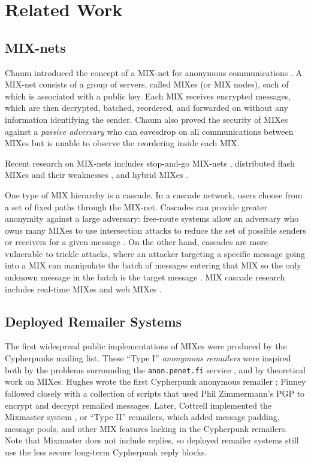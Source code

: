 \documentclass{llncs}
\begin{document}

\section{Related Work}

\subsection{MIX-nets}

Chaum introduced the concept of a MIX-net for anonymous communications
\cite{chaum-mix}. A MIX-net consists of a group of servers, called
MIXes (or MIX nodes), each of which is associated with a public
key. Each MIX receives encrypted messages, which are then decrypted,
batched, reordered, and forwarded on without any information
identifying the sender. Chaum also proved the security of MIXes
against a \emph{passive adversary} who can eavesdrop on all
communications between MIXes but is unable to observe the reordering
inside each MIX.

Recent research on MIX-nets includes stop-and-go MIX-nets
\cite{kesdogan}, distributed flash MIXes \cite{flash-mix} and their
weaknesses \cite{desmedt,mitkuro}, and hybrid MIXes \cite{hybrid-mix}.

One type of MIX hierarchy is a cascade.
In a cascade network, users choose from a set of fixed paths through
the MIX-net.
Cascades can provide greater anonymity against a large adversary:
free-route systems allow an adversary who owns many MIXes to use
intersection attacks to reduce the set of possible senders or receivers
for a given
message \cite{disad-free-routes}. On the other hand, cascades are more
vulnerable \cite{batching-taxonomy} to trickle attacks, where an attacker
targeting a specific message going into a MIX can manipulate the batch
of messages entering that MIX so the only unknown message in the batch
is the target message \cite{mixmaster-attacks,babel}.
MIX cascade research includes real-time MIXes \cite{realtime-mix} and
web MIXes \cite{web-mix}.

\subsection{Deployed Remailer Systems}

The first widespread public implementations of MIXes were produced by the
Cypherpunks mailing list. These ``Type I'' \emph{anonymous remailers}
were inspired both by the problems surrounding the {\tt anon.penet.fi}
service \cite{helsingius}, and by theoretical work on MIXes. Hughes wrote
the first Cypherpunk anonymous remailer \cite{remailer-history}; Finney
followed closely with a collection of scripts that used Phil Zimmermann's
PGP to encrypt and decrypt remailed messages. Later, Cottrell implemented
the Mixmaster system \cite{mixmaster,mixmaster-spec}, or ``Type II'' remailers,
which added message padding, message pools, and other MIX features lacking
in the Cypherpunk remailers. Note that Mixmaster does not include replies,
so deployed remailer systems still use the less secure
long-term Cypherpunk reply blocks.
\end{document}
